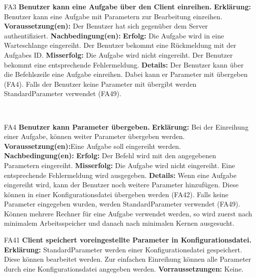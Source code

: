 \documentclass[a4paper,12pt]{article}
\begin{document}
\begin{itemize}[nosep]
    \begin{minipage}[t] {\linewidth}
    	\item[FA3] \textbf{Benutzer kann eine \gls{Aufgabe} über den \gls{Client} einreihen.}
    	\subitem \textbf{Erklärung:} \gls{Benutzer} kann eine \gls{Aufgabe} mit \gls{Parameter}n zur Bearbeitung einreihen.
    	\subitem \textbf{Voraussetzung(en):} Der \gls{Benutzer} hat sich gegenüber dem \gls{Server} authentifiziert.
    	\subitem \textbf{Nachbedingung(en):}
    	\subsubitem \textbf{Erfolg:} Die \gls{Aufgabe} wird in eine \gls{Warteschlange} eingereiht. Der \gls{Benutzer} bekommt eine Rückmeldung mit der \glspl{Aufgabe} ID.
    	\subsubitem \textbf{Misserfolg:} Die \gls{Aufgabe} wird nicht eingereiht. Der \gls{Benutzer} bekommt eine entsprechende Fehlermeldung.
    	\subitem \textbf{Details:} Der \gls{Benutzer} kann über die \gls{Befehlszeile} eine \gls{Aufgabe} einreihen. Dabei kann er \gls{Parameter} mit übergeben (FA4). Falls der \gls{Benutzer} keine \gls{Parameter} mit übergibt werden Standard\gls{Parameter} verwendet (FA49).
   \end{minipage}
   \newline
   \\
	
	\begin{minipage}[t]{\linewidth}
		\item[FA4] \textbf{Benutzer kann \gls{Parameter} übergeben.}
		\subitem \textbf{Erklärung:} Bei der Einreihung einer \gls{Aufgabe}, können weiter \gls{Parameter} übergeben werden.
		\subitem \textbf{Voraussetzung(en):}Eine \gls{Aufgabe} soll eingereiht werden.
		\subitem \textbf{Nachbedingung(en):}
		\subsubitem \textbf{Erfolg:} Der Befehl wird mit den angegebenen \gls{Parameter}n eingereiht.
		\subsubitem \textbf{Misserfolg:} Die \gls{Aufgabe} wird nicht eingereiht. Eine entsprechende Fehlermeldung wird ausgegeben.
		\subitem \textbf{Details:} Wenn eine \gls{Aufgabe} eingereiht wird, kann der \gls{Benutzer} noch weitere \gls{Parameter} hinzufügen. Diese können in einer \gls{Konfigurationsdatei} übergeben werden (FA42). Falls keine \gls{Parameter} eingegeben wurden, werden Standard\gls{Parameter} verwendet (FA49).
		Können mehrere Rechner für eine \gls{Aufgabe} verwendet werden, so wird zuerst nach minimalem Arbeitsspeicher und danach nach minimalen Kernen ausgesucht.
	\end{minipage}
	\pagebreak
	
	\begin{minipage}[t]{\linewidth}
		\item[FA41] \textbf{\gls{Client} speichert voreingestellte \gls{Parameter} in \gls{Konfigurationsdatei}.}
		\subitem \textbf{Erklärung:} Standard\gls{Parameter} werden einer \gls{Konfigurationsdatei} gespeichert.
		Diese können bearbeitet werden. Zur einfachen Einreihung können alle \gls{Parameter} durch eine \gls{Konfigurationsdatei} angegeben werden.
		\subitem \textbf{Vorraussetzungen:} Keine.
		

\end{minipage}
\end{itemize}
\end{document}
